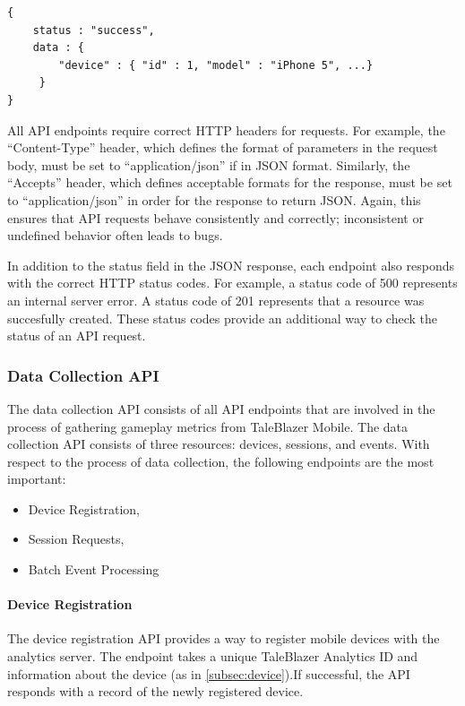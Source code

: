 \medskip
\begin{lstlisting}[caption=Example JSEND format, label={lst:jsend}]
{
    status : "success",
    data : {
        "device" : { "id" : 1, "model" : "iPhone 5", ...}
     }
}
\end{lstlisting}

All API endpoints require correct HTTP headers for requests. For example, the ``Content-Type'' header, which defines the format of parameters in the request body, must be set to ``application/json'' if in JSON format. Similarly, the ``Accepts'' header, which defines acceptable formats for the response, must be set to ``application/json'' in order for the response to return JSON. Again, this ensures that API requests behave consistently and correctly; inconsistent or undefined behavior often leads to bugs.

In addition to the status field in the JSON response, each endpoint also responds with the correct HTTP status codes. For example, a status code of 500 represents an internal server error. A status code of 201 represents that a resource was succesfully created. These status codes provide an additional way to check the status of an API request.

\subsubsection{Data Collection API}
\label{subsec:collection_api}

The data collection API consists of all API endpoints that are involved in the process of gathering gameplay metrics from TaleBlazer Mobile. The data collection API consists of three resources: devices, sessions, and events. With respect to the process of data collection, the following endpoints are the most important:
	\begin{itemize}
		\item Device Registration,
		\item Session Requests,
		\item Batch Event Processing
	\end{itemize}

\paragraph{Device Registration}

The device registration API provides a way to register mobile devices with the analytics server. The endpoint takes a unique TaleBlazer Analytics ID and information about the device (as in \ref{subsec:device}).If successful, the API responds with a record of the newly registered device.

